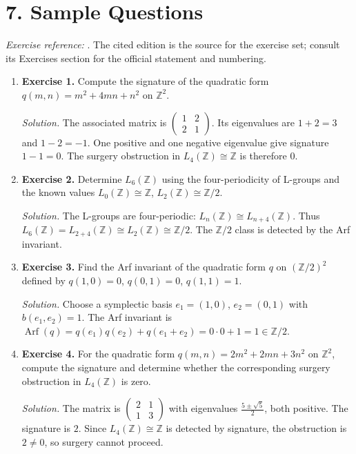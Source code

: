 \section*{7. Sample Questions}
\emph{Exercise reference:} \cite{l_theory_ref1}. The cited edition is the source for the exercise set; consult its Exercises section for the official statement and numbering.
\begin{enumerate}[leftmargin=*,itemsep=0.9em]
\item \textbf{Exercise 1.} Compute the signature of the quadratic form $q(m,n)=m^2+4mn+n^2$ on $\mathbb{Z}^2$.

\emph{Solution.} The associated matrix is $\begin{pmatrix}1&2\\2&1\end{pmatrix}$. Its eigenvalues are $1+2=3$ and $1-2=-1$. One positive and one negative eigenvalue give signature $1-1=0$. The surgery obstruction in $L_4(\mathbb{Z})\cong\mathbb{Z}$ is therefore $0$.

\item \textbf{Exercise 2.} Determine $L_6(\mathbb{Z})$ using the four-periodicity of L-groups and the known values $L_0(\mathbb{Z})\cong\mathbb{Z}$, $L_2(\mathbb{Z})\cong\mathbb{Z}/2$.

\emph{Solution.} The L-groups are four-periodic: $L_n(\mathbb{Z})\cong L_{n+4}(\mathbb{Z})$. Thus $L_6(\mathbb{Z})=L_{2+4}(\mathbb{Z})\cong L_2(\mathbb{Z})\cong\mathbb{Z}/2$. The $\mathbb{Z}/2$ class is detected by the Arf invariant.

\item \textbf{Exercise 3.} Find the Arf invariant of the quadratic form $q$ on $(\mathbb{Z}/2)^2$ defined by $q(1,0)=0$, $q(0,1)=0$, $q(1,1)=1$.

\emph{Solution.} Choose a symplectic basis $e_1=(1,0)$, $e_2=(0,1)$ with $b(e_1,e_2)=1$. The Arf invariant is $\operatorname{Arf}(q)=q(e_1)q(e_2)+q(e_1+e_2)=0\cdot 0+1=1\in\mathbb{Z}/2$.

\item \textbf{Exercise 4.} For the quadratic form $q(m,n)=2m^2+2mn+3n^2$ on $\mathbb{Z}^2$, compute the signature and determine whether the corresponding surgery obstruction in $L_4(\mathbb{Z})$ is zero.

\emph{Solution.} The matrix is $\begin{pmatrix}2&1\\1&3\end{pmatrix}$ with eigenvalues $\frac{5\pm\sqrt{5}}{2}$, both positive. The signature is $2$. Since $L_4(\mathbb{Z})\cong\mathbb{Z}$ is detected by signature, the obstruction is $2\neq 0$, so surgery cannot proceed.


\end{enumerate}

